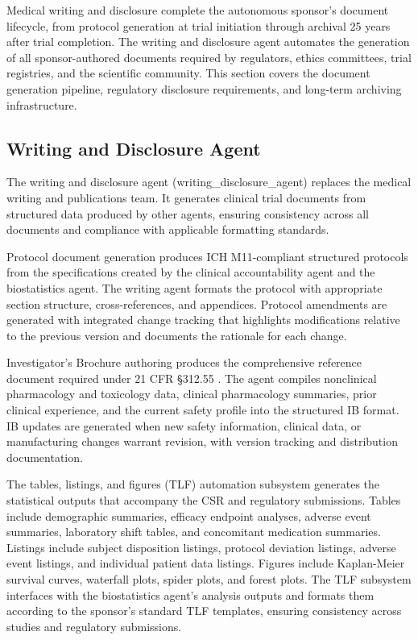 
Medical writing and disclosure complete the autonomous sponsor's document lifecycle, from
protocol generation at trial initiation through archival 25 years after trial completion.
The writing and disclosure agent automates the generation of all sponsor-authored documents
required by regulators, ethics committees, trial registries, and the scientific community.
This section covers the document generation pipeline, regulatory disclosure requirements,
and long-term archiving infrastructure.

\subsection{Writing and Disclosure Agent}

The writing and disclosure agent (writing\_disclosure\_agent) replaces the medical writing
and publications team. It generates clinical trial documents from structured data produced
by other agents, ensuring consistency across all documents and compliance with applicable
formatting standards.

Protocol document generation produces ICH M11-compliant structured protocols \cite{ich-m11}
from the specifications created by the clinical accountability agent and the biostatistics
agent. The writing agent formats the protocol with appropriate section structure, cross-references,
and appendices. Protocol amendments are generated with integrated change tracking that
highlights modifications relative to the previous version and documents the rationale for
each change.

Investigator's Brochure authoring produces the comprehensive reference document required
under 21 CFR \S312.55 \cite{cfr-part-312}. The agent compiles nonclinical pharmacology and
toxicology data, clinical pharmacology summaries, prior clinical experience, and the current
safety profile into the structured IB format. IB updates are generated when new safety
information, clinical data, or manufacturing changes warrant revision, with version tracking
and distribution documentation.

The tables, listings, and figures (TLF) automation subsystem generates the statistical
outputs that accompany the CSR and regulatory submissions. Tables include demographic
summaries, efficacy endpoint analyses, adverse event summaries, laboratory shift tables,
and concomitant medication summaries. Listings include subject disposition listings,
protocol deviation listings, adverse event listings, and individual patient data listings.
Figures include Kaplan-Meier survival curves, waterfall plots, spider plots, and forest
plots. The TLF subsystem interfaces with the biostatistics agent's analysis outputs and
formats them according to the sponsor's standard TLF templates, ensuring consistency
across studies and regulatory submissions.


